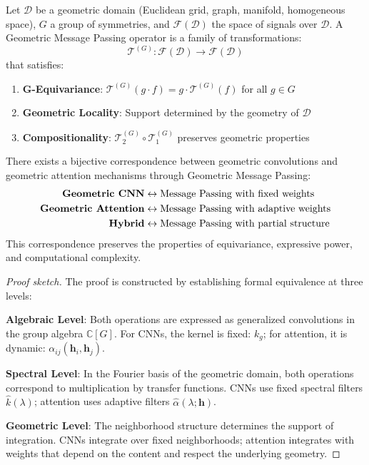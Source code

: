 \begin{definition}\label{def:message_passing_geometrico_generalizado}
Let $\mathcal{D}$ be a geometric domain (Euclidean grid, graph, manifold, homogeneous space), $G$ a group of symmetries, and $\mathcal{F}(\mathcal{D})$ the space of signals over $\mathcal{D}$. A Geometric Message Passing operator is a family of transformations:
\begin{equation}
    \mathcal{T}^{(G)}: \mathcal{F}(\mathcal{D}) \to \mathcal{F}(\mathcal{D})
    \label{eq:message_passing_geometrico_generalizado}
\end{equation}
that satisfies:
\begin{enumerate}
    \item \textbf{G-Equivariance}: $\mathcal{T}^{(G)}(g \cdot f) = g \cdot \mathcal{T}^{(G)}(f)$ for all $g \in G$
    \item \textbf{Geometric Locality}: Support determined by the geometry of $\mathcal{D}$
    \item \textbf{Compositionality}: $\mathcal{T}^{(G)}_2 \circ \mathcal{T}^{(G)}_1$ preserves geometric properties
\end{enumerate}
\end{definition}

\begin{theorem}\label{thm:correspondencia_cnn_attention}
There exists a bijective correspondence between geometric convolutions and geometric attention mechanisms through Geometric Message Passing:
\begin{align}
    \text{\textbf{Geometric CNN}} &\leftrightarrow \text{Message Passing with fixed weights} \\
    \text{\textbf{Geometric Attention}} &\leftrightarrow \text{Message Passing with adaptive weights} \\
    \text{\textbf{Hybrid}} &\leftrightarrow \text{Message Passing with partial structure}
\end{align}
This correspondence preserves the properties of equivariance, expressive power, and computational complexity.
\end{theorem}

\begin{proof}[Proof sketch]
The proof is constructed by establishing formal equivalence at three levels:

\textbf{Algebraic Level}: Both operations are expressed as generalized convolutions in the group algebra $\mathbb{C}[G]$. For CNNs, the kernel is fixed: $k_g$; for attention, it is dynamic: $\alpha_{ij}(\mathbf{h}_i, \mathbf{h}_j)$.

\textbf{Spectral Level}: In the Fourier basis of the geometric domain, both operations correspond to multiplication by transfer functions. CNNs use fixed spectral filters $\hat{k}(\lambda)$; attention uses adaptive filters $\hat{\alpha}(\lambda; \mathbf{h})$.

\textbf{Geometric Level}: The neighborhood structure determines the support of integration. CNNs integrate over fixed neighborhoods; attention integrates with weights that depend on the content and respect the underlying geometry.
\end{proof}

